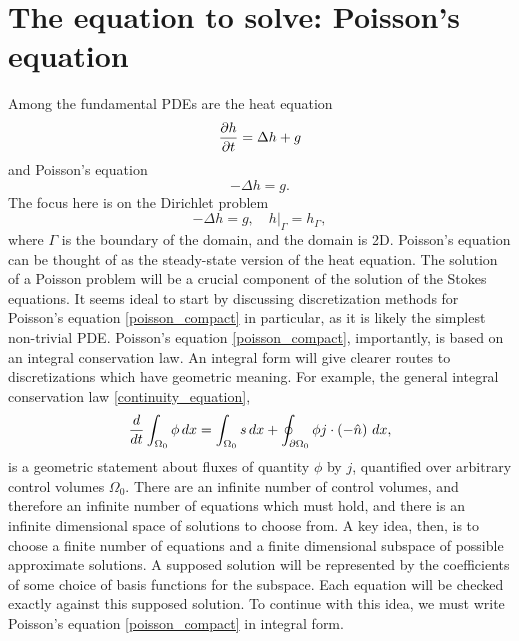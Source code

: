 \section{The equation to solve: Poisson's equation}

Among the fundamental PDEs
are the heat equation
    $$\frac{\partial h}{\partial t} = \Delta h + g$$
and Poisson's equation
\begin{equation}\label{poisson_compact}
    -\Delta h = g.
\end{equation}
The focus here is on the Dirichlet problem
\begin{equation}\label{poisson_dirichlet_problem}
    -\Delta h = g, \quad \left.h\right|_{\Gamma} = h_\Gamma,
\end{equation}
where $\Gamma$ is the boundary of the domain, and the domain is 2D.
Poisson's equation can be thought of as the steady-state version of the heat equation. The solution of a Poisson problem will be a crucial component
of the solution of the Stokes equations. It seems ideal to start by discussing
discretization methods for Poisson's equation \eqref{poisson_compact} in particular,
as it is likely the simplest non-trivial PDE. Poisson's equation \eqref{poisson_compact}, importantly,
is based on an integral conservation law.
An integral form will give clearer routes to discretizations which
have geometric meaning.
For example, the general integral conservation law \eqref{continuity_equation},
\begin{align*}
    \frac{d}{dt} \int_{\Omega_0} \phi\,dx = \int_{\Omega_0} s\,dx + \oint_{{\partial\Omega_0}} \phi j \cdot \left(-\hat{n}\right)\,dx,
\end{align*}
is a geometric statement about fluxes
of quantity $\phi$ by $j$, quantified over arbitrary control volumes $\Omega_0$.
There are an infinite number of control volumes, and therefore an infinite number of equations which must hold, and there is an infinite dimensional
space of solutions to choose from. A key idea, then, is to choose a finite number of equations and a finite dimensional subspace of possible approximate solutions.
A supposed solution will be represented by the coefficients of some choice of basis functions for the subspace. Each equation will be checked exactly against this supposed solution.
To continue with this idea, we must write Poisson's equation \eqref{poisson_compact} in integral form.


